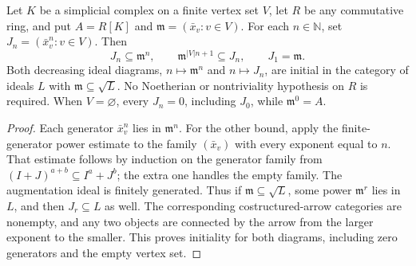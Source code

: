 \begin{lemma}\label{lem:generator-power-ideals}
Let $K$ be a simplicial complex on a finite vertex set $V$, let $R$ be any
commutative ring, and put $A=R[K]$ and $\mathfrak m=(\bar x_v:v\in V)$.
For each $n\in\mathbb N$, set $J_n=(\bar x_v^n:v\in V)$. Then
\[
  J_n\subseteq\mathfrak m^n,\qquad
  \mathfrak m^{|V|n+1}\subseteq J_n,\qquad J_1=\mathfrak m.
\]
Both decreasing ideal diagrams, $n\mapsto\mathfrak m^n$ and
$n\mapsto J_n$, are initial in the category of ideals $L$ with
$\mathfrak m\subseteq\sqrt L$. No Noetherian or nontriviality
hypothesis on $R$ is required. When $V=\varnothing$, every $J_n=0$,
including $J_0$, while $\mathfrak m^0=A$.
\leanok
\end{lemma}
\begin{proof}
Each generator $\bar x_v^n$ lies in $\mathfrak m^n$. For the other
bound, apply the finite-generator power estimate to the family
$(\bar x_v)$ with every exponent equal to $n$. That estimate follows
by induction on the generator family from
$(I+J)^{a+b}\subseteq I^a+J^b$; the extra one handles the empty family.
The augmentation ideal is finitely generated. Thus if
$\mathfrak m\subseteq\sqrt L$, some power $\mathfrak m^r$ lies in $L$,
and then $J_r\subseteq L$ as well. The corresponding costructured-arrow
categories are nonempty, and any two objects are connected by the arrow
from the larger exponent to the smaller. This proves initiality for
both diagrams, including zero generators and the empty vertex set.
\end{proof}

